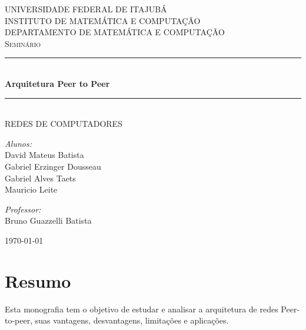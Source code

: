 \documentclass[a4paper]{article}
\newcommand{\HRule}{\rule{\linewidth}{0.5mm}}
\newcommand{\hRule}{\rule{4.5cm}{0.1mm}}
\begin{document}
\onehalfspacing

\begin{titlepage}
\begin{center}

\textsc{\Large UNIVERSIDADE FEDERAL DE ITAJUBÁ\\
	INSTITUTO DE MATEMÁTICA E COMPUTAÇÃO}\\[0.7cm]

\textsc{DEPARTAMENTO DE MATEMÁTICA E COMPUTAÇÃO}\\[2.8cm]

\textsc{\Large Seminário}\\
\HRule \\[0.4cm]
{\Large \bfseries Arquitetura Peer to Peer}
\HRule \\[0.4cm]
\textsc{REDES DE COMPUTADORES}\\[2.8cm]

\begin{minipage}{0.4\textwidth}
\begin{flushleft} \large
\emph{Alunos:}\\[0.43cm]
David Mateus Batista\\
Gabriel Erzinger Dousseau\\
Gabriel Alves Taets\\
Mauricio Leite\\
\end{flushleft}
\end{minipage}
\begin{minipage}{0.4\textwidth}
\begin{flushright} \large
\emph{Professor:}\\[0.4cm]
Bruno Guazzelli Batista
\end{flushright}
\end{minipage}

\vfill

\today

\end{center}
\end{titlepage}

\thispagestyle{empty}

\section*{Resumo}
Esta monografia tem o objetivo de estudar e analisar a arquitetura de redes Peer-to-peer,
suas vantagens, desvantagens, limitações e aplicações.
\newpage
{}
\end{document}
